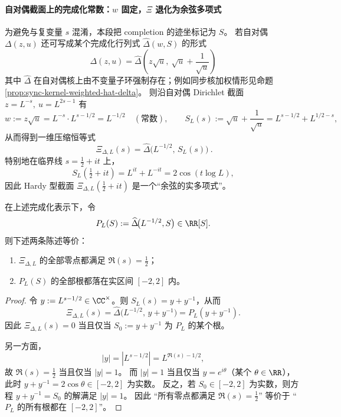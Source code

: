 \paragraph{自对偶截面上的完成化常数：\texorpdfstring{$w$}{w} 固定，\texorpdfstring{$\Xi$}{Xi} 退化为余弦多项式}
为避免与复变量 \(s\) 混淆，本段把 completion 的迹坐标记为 \(S\)。
若自对偶 \(\Delta(z,u)\) 还可写成某个完成化行列式
\(\widehat\Delta(w,S)\) 的形式
\[
\Delta(z,u)=\widehat\Delta\!\left(z\sqrt{u},\ \sqrt{u}+\frac{1}{\sqrt{u}}\right)
\]
其中 \(\widehat\Delta\) 在自对偶核上由不变量子环强制存在；例如同步核加权情形见命题 \ref{prop:sync-kernel-weighted-hat-delta}。
则沿自对偶 Dirichlet 截面 \(z=L^{-s},\ u=L^{2s-1}\) 有
\[
w:=z\sqrt{u}=L^{-s}\cdot L^{s-1/2}=L^{-1/2}\quad(\text{常数}),
\qquad
S_L(s):=\sqrt{u}+\frac{1}{\sqrt{u}}=L^{s-1/2}+L^{1/2-s},
\]
从而得到一维压缩恒等式
\[
\boxed{\ \Xi_{\Delta,L}(s)=\widehat\Delta\!\bigl(L^{-1/2},\,S_L(s)\bigr)\ }.
\]
特别地在临界线 \(s=\tfrac12+it\) 上，
\[
S_L\!\left(\tfrac12+it\right)=L^{it}+L^{-it}=2\cos(t\log L),
\]
因此 Hardy 型截面 \(\Xi_{\Delta,L}(\tfrac12+it)\) 是一个“余弦的实多项式”。



\begin{proposition}\label{prop:xi-rh-interval-criterion}
在上述完成化表示下，令
\[
P_L(S):=\widehat\Delta\!\bigl(L^{-1/2},S\bigr)\in\RR[S].
\]
则下述两条陈述等价：
\begin{enumerate}
  \item \(\Xi_{\Delta,L}\) 的全部零点都满足 \(\Re(s)=\tfrac12\)；
  \item \(P_L(S)\) 的全部根都落在实区间 \([-2,2]\) 内。
\end{enumerate}
\end{proposition}
\begin{proof}
令 \(y:=L^{s-1/2}\in\CC^\times\)。则 \(S_L(s)=y+y^{-1}\)，从而
\[
\Xi_{\Delta,L}(s)=\widehat\Delta\!\bigl(L^{-1/2},\,y+y^{-1}\bigr)=P_L(y+y^{-1}).
\]
因此 \(\Xi_{\Delta,L}(s)=0\) 当且仅当 \(S_0:=y+y^{-1}\) 为 \(P_L\) 的某个根。
\par
另一方面，
\[
|y|=|L^{s-1/2}|=L^{\Re(s)-1/2},
\]
故 \(\Re(s)=\tfrac12\) 当且仅当 \(|y|=1\)。
而 \(|y|=1\) 当且仅当 \(y=e^{i\theta}\)（某个 \(\theta\in\RR\)），此时
\(
y+y^{-1}=2\cos\theta\in[-2,2]
\) 为实数。
反之，若 \(S_0\in[-2,2]\) 为实数，则方程 \(y+y^{-1}=S_0\) 的解满足 \(|y|=1\)。
因此 “所有零点都满足 \(\Re(s)=\tfrac12\)” 等价于 “\(P_L\) 的所有根都在 \([-2,2]\)”。
\end{proof}

